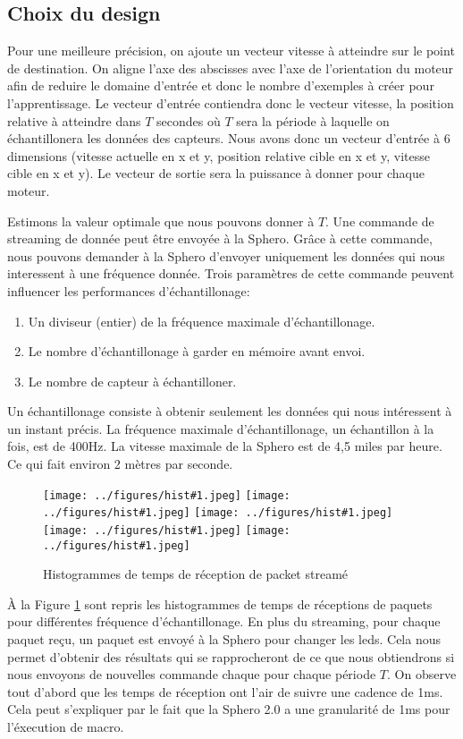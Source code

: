 \newcommand{\inchist}[1]{\texttt{[image: ../figures/hist\#1.jpeg]}}
\subsection{Choix du design}
Pour une meilleure précision, on ajoute un vecteur vitesse à atteindre sur le point de destination.
On aligne l'axe des abscisses avec l'axe de l'orientation du moteur afin de reduire le domaine d'entrée et donc le nombre d'exemples à créer pour l'apprentissage.
Le vecteur d'entrée contiendra donc le vecteur vitesse, la position relative à atteindre dans $T$ secondes où $T$ sera la période à laquelle on échantillonera les données des capteurs.
Nous avons donc un vecteur d'entrée à 6 dimensions (vitesse actuelle en x et y, position relative cible en x et y, vitesse cible en x et y).
Le vecteur de sortie sera la puissance à donner pour chaque moteur.

Estimons la valeur optimale que nous pouvons donner à $T$.
Une commande de streaming de donnée peut être envoyée à la Sphero.
Grâce à cette commande, nous pouvons demander à la Sphero d'envoyer uniquement les données qui nous interessent à une fréquence donnée.
Trois paramètres de cette commande peuvent influencer les performances d'échantillonage:
\begin{enumerate}
 \item Un diviseur (entier) de la fréquence maximale d'échantillonage.
 \item Le nombre d'échantillonage à garder en mémoire avant envoi.
 \item Le nombre de capteur à échantilloner.
\end{enumerate}
Un échantillonage consiste à obtenir seulement les données qui nous intéressent à un instant précis.
La fréquence maximale d'échantillonage, un échantillon à la fois, est de 400Hz.\cite{SDKofficiels}
La vitesse maximale de la Sphero est de 4,5 miles par heure.\cite{product} Ce qui fait environ 2 mètres par seconde.
\begin{figure}
 \centering
 \inchist{20}
 \inchist{60}
 \inchist{80}
 \inchist{100}
 \inchist{200}
 \caption{Histogrammes de temps de réception de packet streamé}
 \label{histogrammes}
\end{figure}

À la Figure \ref{histogrammes} sont repris les histogrammes de temps de réceptions de paquets pour différentes fréquence d'échantillonage.
En plus du streaming, pour chaque paquet reçu, un paquet est envoyé à la Sphero pour changer les leds.
Cela nous permet d'obtenir des résultats qui se rapprocheront de ce que nous obtiendrons si nous envoyons de nouvelles commande chaque pour chaque période $T$.
On observe tout d'abord que les temps de réception ont l'air de suivre une cadence de 1ms.
Cela peut s'expliquer par le fait que la Sphero 2.0 a une granularité de 1ms pour l'éxecution de macro.\cite{product}

